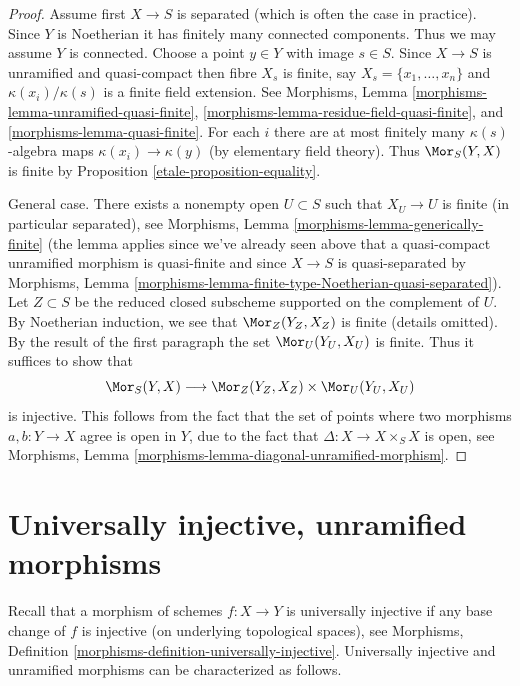 \begin{proof}

Assume first $X \to S$ is separated (which is often the case in practice).
Since $Y$ is Noetherian it has finitely many connected components. Thus we
may assume $Y$ is connected. Choose a point $y \in Y$ with image $s \in S$.
Since $X \to S$ is unramified and quasi-compact
then fibre $X_s$ is finite, say $X_s = \{x_1, \ldots, x_n\}$
and $\kappa(x_i)/\kappa(s)$ is a finite field extension.
See Morphisms, Lemma \ref{morphisms-lemma-unramified-quasi-finite},
\ref{morphisms-lemma-residue-field-quasi-finite}, and
\ref{morphisms-lemma-quasi-finite}.
For each $i$ there are at most finitely many $\kappa(s)$-algebra
maps $\kappa(x_i) \to \kappa(y)$ (by elementary field theory).
Thus $\Mor_S(Y, X)$ is finite by
Proposition \ref{etale-proposition-equality}.

\medskip\noindent
General case. There exists a nonempty open $U \subset S$ such
that $X_U \to U$ is finite (in particular separated), see
Morphisms, Lemma \ref{morphisms-lemma-generically-finite}
(the lemma applies since we've already seen above that a quasi-compact
unramified morphism is quasi-finite and since $X \to S$ is quasi-separated by
Morphisms, Lemma \ref{morphisms-lemma-finite-type-Noetherian-quasi-separated}).
Let $Z \subset S$ be the reduced closed subscheme supported on
the complement of $U$. By Noetherian induction, we see that
$\Mor_Z(Y_Z, X_Z)$ is finite (details omitted).
By the result of the first paragraph the set
$\Mor_U(Y_U, X_U)$ is finite. Thus it suffices to show that
$$
\Mor_S(Y, X) \longrightarrow \Mor_Z(Y_Z, X_Z) \times \Mor_U(Y_U, X_U)
$$
is injective. This follows from the fact that the set of points where
two morphisms $a, b : Y \to X$ agree is open in $Y$, due to the fact
that $\Delta : X \to X \times_S X$ is open, see
Morphisms, Lemma \ref{morphisms-lemma-diagonal-unramified-morphism}.
\end{proof}

\section{Universally injective, unramified morphisms}
\label{etale-section-universally-injective-unramified}
Recall that a morphism of schemes $f : X \to Y$ is universally
injective if any base change of $f$ is injective (on underlying
topological spaces), see
Morphisms, Definition \ref{morphisms-definition-universally-injective}.
Universally injective and unramified morphisms can be
characterized as follows.

